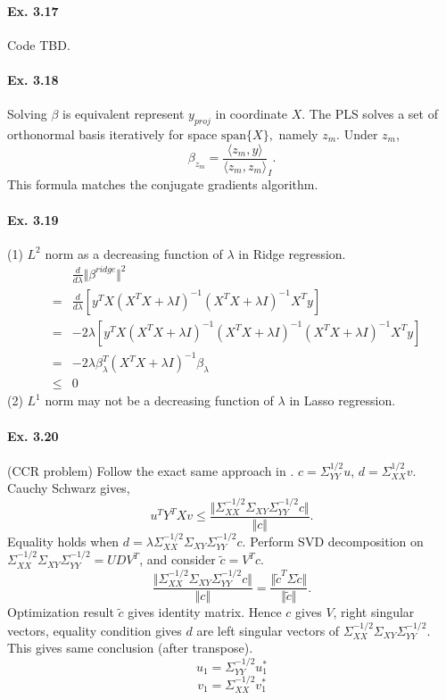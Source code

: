 \paragraph*{Ex. 3.17}
Code TBD.

\paragraph*{Ex. 3.18}
Solving $\beta$ is equivalent represent $y_{proj}$ in coordinate $X$. The PLS solves a set of orthonormal basis iteratively for space $\mbox{span}\{X\},$ namely $z_{m}.$ Under $z_{m}$,
$$\beta_{z_m}=\frac{\langle z_{m}, y\rangle}{\langle z_{m}, z_{m}\rangle}_{I}.$$
This formula matches the conjugate gradients algorithm.

\paragraph*{Ex. 3.19}
(1) $L^2$ norm as a decreasing function of $\lambda$ in Ridge regression.
\begin{eqnarray*}
    &&\frac{d}{d\lambda} \Vert \beta^{ridge}\Vert^2\\
    &=&\frac{d}{d\lambda} [y^TX(X^TX + \lambda I)^{-1}(X^TX + \lambda I)^{-1}X^Ty]\\
    &=&-2\lambda [y^TX(X^TX + \lambda I)^{-1}(X^TX + \lambda I)^{-1}(X^TX + \lambda I)^{-1}X^Ty]\\
    &=&-2\lambda \beta_{\lambda}^T(X^TX + \lambda I)^{-1}\beta_{\lambda} \\
    &\leq& 0
\end{eqnarray*}
(2) $L^1$ norm may not be a decreasing function of $\lambda$ in Lasso regression.

\paragraph*{Ex. 3.20}
(CCR problem) Follow the exact same approach in \cite{Wiki_CCR}.
$c = \Sigma_{YY}^{1/2}u$, $d = \Sigma_{XX}^{1/2}v$.
Cauchy Schwarz gives,
$$u^TY^TXv\leq\frac{\Vert \Sigma_{XX}^{-1/2}\Sigma_{XY}\Sigma_{YY}^{-1/2}c \Vert}{\Vert c \Vert}.$$
Equality holds when $d = \lambda \Sigma_{XX}^{-1/2}\Sigma_{XY}\Sigma_{YY}^{-1/2}c.$ Perform SVD decomposition on $ \Sigma_{XX}^{-1/2}\Sigma_{XY}\Sigma_{YY}^{-1/2} = UD V^{T}$, and consider $\tilde{c} = V^T c.$
$$\frac{\Vert \Sigma_{XX}^{-1/2}\Sigma_{XY}\Sigma_{YY}^{-1/2}c \Vert}{\Vert c \Vert}=\frac{\Vert\tilde{c}^T \Sigma \tilde{c}\Vert}{\Vert \tilde{c}\Vert}.$$
Optimization result $\tilde{c}$ gives identity matrix. Hence $c$ gives $V$, right singular vectors, equality condition gives $d$ are left singular vectors of $\Sigma_{XX}^{-1/2}\Sigma_{XY}\Sigma_{YY}^{-1/2}$. This gives same conclusion (after transpose).
$$u_1 = \Sigma_{YY}^{-1/2} u_{1}^*$$
$$v_1 = \Sigma_{XX}^{-1/2} v_{1}^*$$

